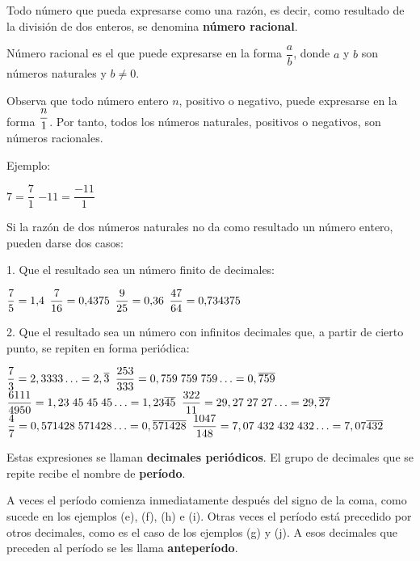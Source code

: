 Todo número que pueda expresarse como una razón, es decir, como resultado 
de la división de dos enteros, se denomina \textbf{número racional}.

\begin{defbox}
Número racional es el que puede expresarse en la forma $\dfrac{a}{b}$,  
donde $a$ y $b$ son números naturales y $b \neq 0$.
\end{defbox}

Observa que todo número entero $n$, positivo o negativo, puede expresarse en 
la forma $\nfrac[4pt]{n}{1}$. Por tanto, todos los números naturales, positivos o 
negativos, son números racionales.
\newpage

Ejemplo: 

\begin{ejemplos}[2][\textbullet]
  \task $7 = \dfrac{7}{1}$
  \task $-11 = \dfrac{-11}{1}$
\end{ejemplos}

Si la razón de dos números naturales no da como resultado un número entero, 
pueden darse dos casos:

1. Que el resultado sea un número finito de decimales:

\noindent {}

\begin{ejemplos}[2][(\alph*)]
  \task $\dfrac{7}{5} = \numes{1.4}$
  \task $\dfrac{7}{16} = \numes{0.4375}$
  \task $\dfrac{9}{25} = \numes{0.36}$
  \task $\dfrac{47}{64} = \numes{0.734375}$
\end{ejemplos}


2. Que el resultado sea un número con infinitos decimales que, a partir
   de cierto punto, se repiten en forma periódica:

\begin{ejemplos}[2][(\alph*)]
  \task $\dfrac{7}{3} = 2,3333\ldots = 2,\overline{3}$
  \task $\dfrac{253}{333} = 0,759\;759\;759\ldots = 0,\overline{759}$
  \task $\dfrac{6111}{4950} = 1,23\;45\;45\;45\ldots = 1,23\overline{45}$
  \task $\dfrac{322}{11} = 29,27\;27\;27\ldots = 29,\overline{27}$
  \task $\dfrac{4}{7} = 0,571428\;571428\ldots = 0,\overline{571428}$
  \task $\dfrac{1047}{148} = 7,07\;432\;432\;432\ldots = 7,07\overline{432}$
\end{ejemplos}


Estas expresiones se llaman \textbf{decimales periódicos}. 
El grupo de decimales que se repite recibe el nombre de \textbf{período}.  

A veces el período comienza inmediatamente después del signo de la coma, 
como sucede en los ejemplos (e), (f), (h) e (i). Otras veces el período está 
precedido por otros decimales, como es el caso de los ejemplos (g) y (j). 
A esos decimales que preceden al período se les llama  \textbf{anteperíodo}. 

